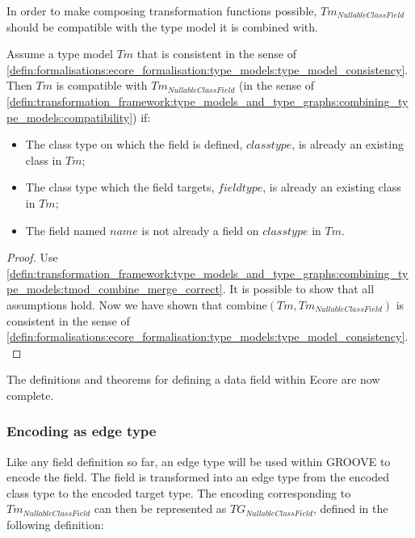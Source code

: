 In order to make composing transformation functions possible, $Tm_{NullableClassField}$ should be compatible with the type model it is combined with.

\begin{thm}
\label{defin:library_of_transformations:type_level_transformations:nullable_class_fields:tmod_nullable_class_field_combine_correct}
Assume a type model $Tm$ that is consistent in the sense of \cref{defin:formalisations:ecore_formalisation:type_models:type_model_consistency}. Then $Tm$ is compatible with $Tm_{NullableClassField}$ (in the sense of \cref{defin:transformation_framework:type_models_and_type_graphs:combining_type_models:compatibility}) if:
\begin{itemize}
    \item The class type on which the field is defined, $classtype$, is already an existing class in $Tm$;
    \item The class type which the field targets, $fieldtype$, is already an existing class in $Tm$;
    \item The field named $name$ is not already a field on $classtype$ in $Tm$.
\end{itemize}
\end{thm}

\begin{proof}
Use \cref{defin:transformation_framework:type_models_and_type_graphs:combining_type_models:tmod_combine_merge_correct}. It is possible to show that all assumptions hold. Now we have shown that $\mathrm{combine}(Tm, Tm_{NullableClassField})$ is consistent in the sense of \cref{defin:formalisations:ecore_formalisation:type_models:type_model_consistency}.
\end{proof}

The definitions and theorems for defining a data field within Ecore are now complete. 

\subsubsection{Encoding as edge type}

Like any field definition so far, an edge type will be used within GROOVE to encode the field. The field is transformed into an edge type from the encoded class type to the encoded target type. The encoding corresponding to $Tm_{NullableClassField}$ can then be represented as $TG_{NullableClassField}$, defined in the following definition:

